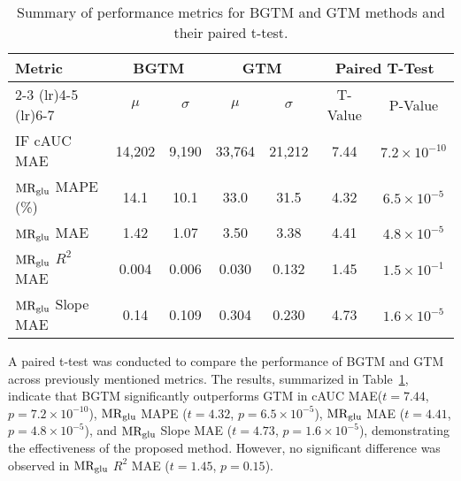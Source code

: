 \begin{table}[b]
	\centering
	\begin{tabular}{l|cc|cc|cc}
		\toprule
		\multirow{3}{*}{\textbf{Metric}} & \multicolumn{2}{c|}{\textbf{BGTM}} & \multicolumn{2}{c}{\textbf{GTM}} & \multicolumn{2}{c}{\textbf{Paired T-Test}}                                                 \\
		\cmidrule(lr){2-3} \cmidrule(lr){4-5} \cmidrule(lr){6-7}
		                                 & \(\mu\)                            & \(\sigma\)                       & \(\mu\)                                    & \(\sigma\) & T-Value & P-Value                \\
		\midrule
		IF cAUC MAE                      & 14,202                             & 9,190                            & 33,764                                     & 21,212     & 7.44    & \(7.2\times 10^{-10}\) \\
		$\text{MR}_{\text{glu}}$ MAPE (\%)               & 14.1                               & 10.1                             & 33.0                                       & 31.5       & 4.32    & \(6.5\times 10^{-5}\)  \\
		$\text{MR}_{\text{glu}}$ MAE                     & 1.42                               & 1.07                             & 3.50                                       & 3.38       & 4.41    & \(4.8\times 10^{-5}\)  \\
		$\text{MR}_{\text{glu}}$ \(R^2\) MAE             & 0.004                              & 0.006                            & 0.030                                      & 0.132      & 1.45    & \(1.5\times 10^{-1}\)  \\
		$\text{MR}_{\text{glu}}$ Slope MAE               & 0.14                               & 0.109                            & 0.304                                      & 0.230      & 4.73    & \(1.6\times 10^{-5}\)  \\
		\bottomrule
	\end{tabular}
	\caption{Summary of performance metrics for BGTM and GTM methods and their paired t-test.
	}
	\label{tab:metrics}
\end{table}

\newpage
A paired t-test was conducted to compare the performance of BGTM and GTM across previously mentioned metrics.
The results, summarized in Table~\ref{tab:metrics}, indicate that BGTM significantly outperforms GTM in cAUC MAE(\( t = 7.44 \), \( p = 7.2 \times 10^{-10} \)), $\text{MR}_{\text{glu}}$ MAPE (\( t = 4.32 \), \( p = 6.5 \times 10^{-5} \)), $\text{MR}_{\text{glu}}$ MAE (\( t = 4.41 \), \( p = 4.8 \times 10^{-5} \)), and $\text{MR}_{\text{glu}}$ Slope MAE (\( t = 4.73 \), \( p = 1.6 \times 10^{-5} \)), demonstrating the effectiveness of the proposed method.
However, no significant difference was observed in $\text{MR}_{\text{glu}}$ \(R^2\) MAE (\( t = 1.45 \), \( p = 0.15 \)).


